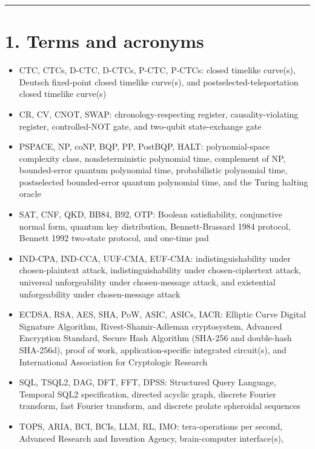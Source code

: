 \documentclass[10pt,letterpaper]{article}
\providecommand{\tightlist}{\setlength{\itemsep}{1pt}\setlength{\parskip}{0pt}}
\begin{document}
\begin{center}\rule{0.5\linewidth}{0.5pt}\end{center}

\section{1. Terms and acronyms}\label{terms-and-acronyms}

\begin{itemize}
\tightlist
\item
  CTC, CTCs, D-CTC, D-CTCs, P-CTC, P-CTCs: closed timelike curve(s),
  Deutsch fixed-point closed timelike curve(s), and
  postselected-teleportation closed timelike curve(s)
\item
  CR, CV, CNOT, SWAP: chronology-respecting register,
  causality-violating register, controlled-NOT gate, and two-qubit
  state-exchange gate
\item
  PSPACE, NP, coNP, BQP, PP, PostBQP, HALT: polynomial-space complexity
  class, nondeterministic polynomial time, complement of NP,
  bounded-error quantum polynomial time, probabilistic polynomial time,
  postselected bounded-error quantum polynomial time, and the Turing
  halting oracle
\item
  SAT, CNF, QKD, BB84, B92, OTP: Boolean satisfiability, conjunctive
  normal form, quantum key distribution, Bennett-Brassard 1984 protocol,
  Bennett 1992 two-state protocol, and one-time pad
\item
  IND-CPA, IND-CCA, UUF-CMA, EUF-CMA: indistinguishability under
  chosen-plaintext attack, indistinguishability under chosen-ciphertext
  attack, universal unforgeability under chosen-message attack, and
  existential unforgeability under chosen-message attack
\item
  ECDSA, RSA, AES, SHA, PoW, ASIC, ASICs, IACR: Elliptic Curve Digital
  Signature Algorithm, Rivest-Shamir-Adleman cryptosystem, Advanced
  Encryption Standard, Secure Hash Algorithm (SHA-256 and double-hash
  SHA-256d), proof of work, application-specific integrated circuit(s),
  and International Association for Cryptologic Research
\item
  SQL, TSQL2, DAG, DFT, FFT, DPSS: Structured Query Language, Temporal
  SQL2 specification, directed acyclic graph, discrete Fourier
  transform, fast Fourier transform, and discrete prolate spheroidal
  sequences
\item
  TOPS, ARIA, BCI, BCIs, LLM, RL, IMO: tera-operations per second,
  Advanced Research and Invention Agency, brain-computer interface(s),

\end{itemize}
\end{document}
